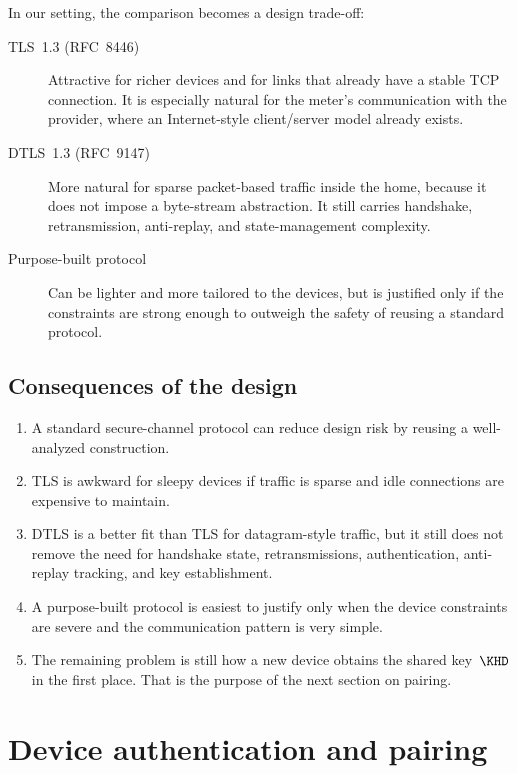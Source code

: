 In our setting, the comparison becomes a design trade-off:
\begin{description}
  \item[TLS~1.3 (RFC~8446)] Attractive for richer devices and for links that
    already have a stable TCP connection.
    It is especially natural for the meter's communication with the provider,
    where an Internet-style client/server model already exists.
  \item[DTLS~1.3 (RFC~9147)] More natural for sparse packet-based traffic
    inside the home, because it does not impose a byte-stream abstraction.
    It still carries handshake, retransmission, anti-replay, and
    state-management complexity.
  \item[Purpose-built protocol] Can be lighter and more tailored to the
    devices, but is justified only if the constraints are strong enough to
    outweigh the safety of reusing a standard protocol.
\end{description}

\subsection{Consequences of the design}

\begin{enumerate}
  \item A standard secure-channel protocol can reduce design risk by reusing a
    well-analyzed construction.
  \item TLS is awkward for sleepy devices if traffic is sparse and idle
    connections are expensive to maintain.
  \item DTLS is a better fit than TLS for datagram-style traffic, but it still
    does not remove the need for handshake state, retransmissions,
    authentication, anti-replay tracking, and key establishment.
  \item A purpose-built protocol is easiest to justify only when the device
    constraints are severe and the communication pattern is very simple.
  \item The remaining problem is still how a new device obtains the shared
    key~\(\KHD\) in the first place.
    That is the purpose of the next section on pairing.
\end{enumerate}


\section{Device authentication and pairing}\label{EnergyPairing}

